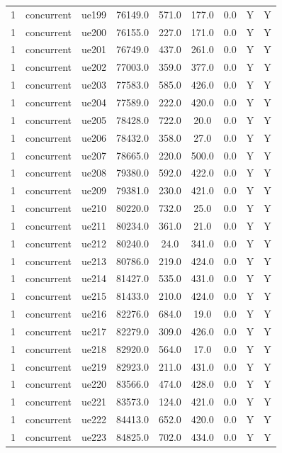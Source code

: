 \begin{table}[ht]
\begin{tabular}{|c|c|c|c|c|c|c|c|c|}
1 & concurrent & ue199 & 76149.0 & 571.0 & 177.0 & 0.0 & Y & Y \\
1 & concurrent & ue200 & 76155.0 & 227.0 & 171.0 & 0.0 & Y & Y \\
1 & concurrent & ue201 & 76749.0 & 437.0 & 261.0 & 0.0 & Y & Y \\
1 & concurrent & ue202 & 77003.0 & 359.0 & 377.0 & 0.0 & Y & Y \\
1 & concurrent & ue203 & 77583.0 & 585.0 & 426.0 & 0.0 & Y & Y \\
1 & concurrent & ue204 & 77589.0 & 222.0 & 420.0 & 0.0 & Y & Y \\
1 & concurrent & ue205 & 78428.0 & 722.0 & 20.0 & 0.0 & Y & Y \\
1 & concurrent & ue206 & 78432.0 & 358.0 & 27.0 & 0.0 & Y & Y \\
1 & concurrent & ue207 & 78665.0 & 220.0 & 500.0 & 0.0 & Y & Y \\
1 & concurrent & ue208 & 79380.0 & 592.0 & 422.0 & 0.0 & Y & Y \\
1 & concurrent & ue209 & 79381.0 & 230.0 & 421.0 & 0.0 & Y & Y \\
1 & concurrent & ue210 & 80220.0 & 732.0 & 25.0 & 0.0 & Y & Y \\
1 & concurrent & ue211 & 80234.0 & 361.0 & 21.0 & 0.0 & Y & Y \\
1 & concurrent & ue212 & 80240.0 & 24.0 & 341.0 & 0.0 & Y & Y \\
1 & concurrent & ue213 & 80786.0 & 219.0 & 424.0 & 0.0 & Y & Y \\
1 & concurrent & ue214 & 81427.0 & 535.0 & 431.0 & 0.0 & Y & Y \\
1 & concurrent & ue215 & 81433.0 & 210.0 & 424.0 & 0.0 & Y & Y \\
1 & concurrent & ue216 & 82276.0 & 684.0 & 19.0 & 0.0 & Y & Y \\
1 & concurrent & ue217 & 82279.0 & 309.0 & 426.0 & 0.0 & Y & Y \\
1 & concurrent & ue218 & 82920.0 & 564.0 & 17.0 & 0.0 & Y & Y \\
1 & concurrent & ue219 & 82923.0 & 211.0 & 431.0 & 0.0 & Y & Y \\
1 & concurrent & ue220 & 83566.0 & 474.0 & 428.0 & 0.0 & Y & Y \\
1 & concurrent & ue221 & 83573.0 & 124.0 & 421.0 & 0.0 & Y & Y \\
1 & concurrent & ue222 & 84413.0 & 652.0 & 420.0 & 0.0 & Y & Y \\
1 & concurrent & ue223 & 84825.0 & 702.0 & 434.0 & 0.0 & Y & Y \\

\end{tabular}
\end{table}
